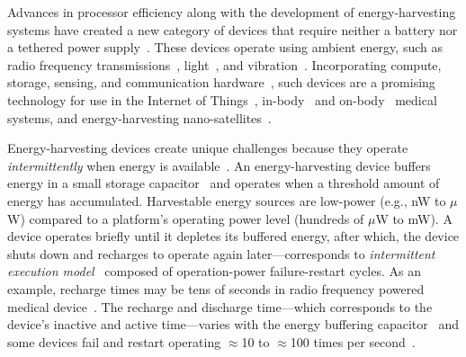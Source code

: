 

Advances in processor efficiency along with the development of
energy-harvesting systems have created a new category of devices that require
neither a battery nor a tethered power
supply~\cite{prasad_comst_2014,lucia_snapl_2017,soyata_csm_2016}. These
devices operate using ambient energy, such as radio frequency
transmissions~\cite{rf_powered_computing_gollakota_2014},
light~\cite{margolies_infocom_2016,margolies_tosn_2016}, and
vibration~\cite{gorlatova_sigmetrics_2014}. Incorporating compute, storage,
sensing, and communication hardware~\cite{wisp5,moo,capybara}, such devices are a
promising technology for use in the Internet of Things~\cite{ku_cst_2016},
in-body~\cite{nadeau_naturebio_2017} and
on-body~\cite{bandodkar_electroanalysis_2015} medical systems, and
energy-harvesting nano-satellites~\cite{kicksat,capybara}.

Energy-harvesting devices create unique challenges because they operate {\em
intermittently} when energy is
available~\cite{hicks_isca_2017,lucia_snapl_2017}. An energy-harvesting device
buffers energy in a small storage capacitor~\cite{gorlatova_tmc_2013,gunduz_commag_2014} and operates when a
threshold amount of energy has accumulated. Harvestable energy sources are low-power (e.g., nW to $\mu$W) compared to a platform's operating
power level (hundreds of $\mu$W to mW). A device operates briefly until it depletes its buffered energy, after which, the device shuts
down and recharges to operate again later---corresponds to {\em intermittent execution model}~\cite{dino,lucia_snapl_2017} composed of
operation-power failure-restart cycles. As an example, recharge times may be
tens of seconds in radio frequency powered medical device~\cite[Fig.
3c]{nadeau_naturebio_2017}. The recharge and discharge time---which corresponds to the device's inactive and active time---varies with the energy buffering capacitor~\cite{capybara} and some devices fail and restart operating $\approx$10 to
$\approx$100 times per second~\cite{tan_infocom_2016,mementos,nvp}.

